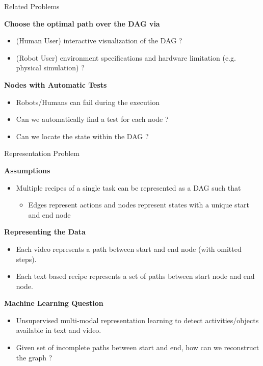 \begin{frame}{Related Problems}

{\bf Choose the optimal path over the DAG via}
\begin{itemize}
\item (Human User) interactive visualization of the DAG ?
\item (Robot User) environment specifications and hardware limitation (e.g. physical simulation) ?
\end{itemize}
{\bf Nodes with Automatic Tests}
\begin{itemize}
\item Robots/Humans can fail during the execution
\item Can we automatically find a test for each node ?
\item Can we locate the state within the DAG ?
\end{itemize}
\end{frame}

\begin{frame}{Representation Problem}

{\bf Assumptions}
\begin{itemize}
\item Multiple recipes of a single task can be represented as a DAG such that
\begin{itemize}
\item Edges represent actions and nodes represent states with a unique start and end node
\end{itemize}
\end{itemize}

{\bf Representing the Data}
\begin{itemize}
\item Each video represents a path between start and end node (with omitted steps).
\item Each text based recipe represents a set of paths between start node and end node.
\end{itemize}

{\bf Machine Learning Question}
\begin{itemize}
\item Unsupervised multi-modal representation learning to detect activities/objects available in text and video.
\item Given set of incomplete paths between start and end, how can we reconstruct the graph ?
\end{itemize}
\end{frame}

